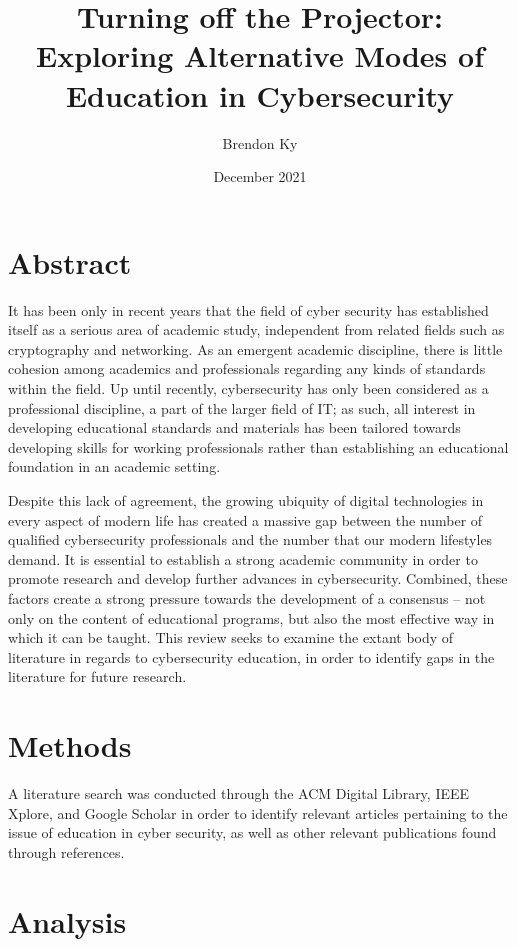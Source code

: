\documentclass{article}
\title{
    Turning off the Projector: \\
    \large Exploring Alternative Modes of Education in Cybersecurity
}
\author{Brendon Ky}
\date{December 2021}
\begin{document}
\maketitle

\section{Abstract}

    It has been only in recent years that the field of cyber security has established itself as a serious area of academic study, independent from related fields such as cryptography and networking. 
    As an emergent academic discipline, there is little cohesion among academics and professionals regarding any kinds of standards within the field. 
    Up until recently, cybersecurity has only been considered as a professional discipline, a part of the larger field of IT; 
    as such, all interest in developing educational standards and materials has been tailored towards developing skills for working professionals rather than establishing an educational foundation in an academic setting. 

    Despite this lack of agreement, the growing ubiquity of digital technologies in every aspect of modern life has created a massive gap between the number of qualified cybersecurity professionals and the number that our modern lifestyles demand. It is essential to establish a strong academic community in order to promote research and develop further advances in cybersecurity. 
    Combined, these factors create a strong pressure towards the development of a consensus -- not only on the content of educational programs, but also the most effective way in which it can be taught. 
    This review seeks to examine the extant body of literature in regards to cybersecurity education, in order to identify gaps in the literature for future research.

\section{Methods}

    A literature search was conducted through the ACM Digital Library, IEEE Xplore, and Google Scholar in order to identify relevant articles pertaining to the issue of education in cyber security, as well as other relevant publications found through references.

\section{Analysis}
\end{document}
